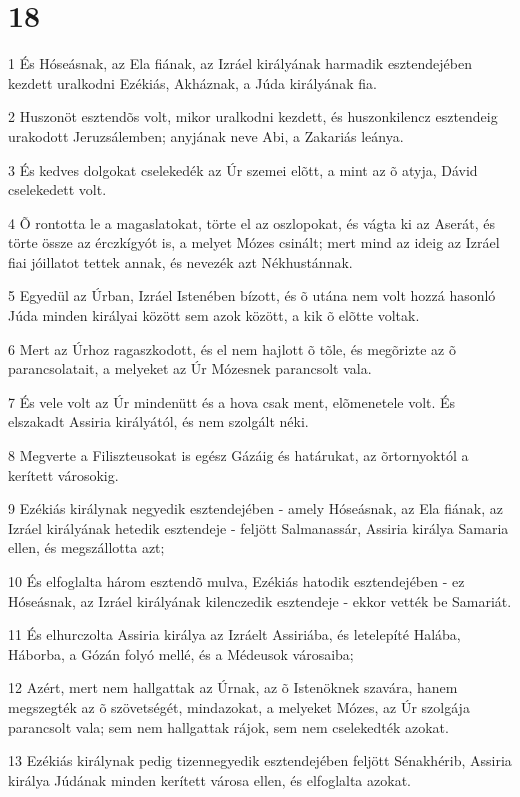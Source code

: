 \chapter{18}

\par 1 És Hóseásnak, az Ela fiának, az Izráel királyának harmadik esztendejében kezdett uralkodni Ezékiás, Akháznak, a Júda királyának fia.
\par 2 Huszonöt esztendõs volt, mikor uralkodni kezdett, és huszonkilencz esztendeig urakodott Jeruzsálemben; anyjának neve Abi, a Zakariás leánya.
\par 3 És kedves dolgokat cselekedék az Úr szemei elõtt, a mint az õ atyja, Dávid cselekedett volt.
\par 4 Õ rontotta le a magaslatokat, törte el az oszlopokat, és vágta ki az Aserát, és törte össze az érczkígyót is, a melyet Mózes  csinált; mert mind az ideig az Izráel fiai jóillatot tettek annak, és nevezék azt Nékhustánnak.
\par 5 Egyedül az Úrban, Izráel Istenében bízott, és õ utána nem volt hozzá hasonló Júda minden királyai között sem azok között, a kik õ  elõtte voltak.
\par 6 Mert az Úrhoz ragaszkodott, és el nem hajlott õ tõle, és megõrizte az õ parancsolatait, a melyeket az Úr Mózesnek parancsolt vala.
\par 7 És vele volt az Úr mindenütt és a hova csak ment, elõmenetele volt. És elszakadt Assiria királyától, és nem szolgált néki.
\par 8 Megverte a Filiszteusokat is egész Gázáig és határukat, az õrtornyoktól a kerített városokig.
\par 9 Ezékiás királynak negyedik esztendejében - amely Hóseásnak, az Ela fiának, az Izráel királyának hetedik esztendeje - feljött Salmanassár, Assiria királya Samaria ellen, és megszállotta azt;
\par 10 És elfoglalta három esztendõ mulva, Ezékiás hatodik esztendejében - ez Hóseásnak, az Izráel királyának kilenczedik esztendeje - ekkor vették be Samariát.
\par 11 És elhurczolta Assiria királya az Izráelt Assiriába, és letelepíté Halába, Háborba, a Gózán folyó mellé, és a Médeusok városaiba;
\par 12 Azért, mert nem hallgattak az Úrnak, az õ Istenöknek szavára, hanem megszegték az õ szövetségét, mindazokat, a melyeket Mózes, az Úr szolgája parancsolt vala; sem nem hallgattak rájok, sem nem cselekedték azokat.
\par 13 Ezékiás királynak pedig tizennegyedik esztendejében feljött Sénakhérib, Assiria királya Júdának minden kerített városa ellen, és elfoglalta azokat.
